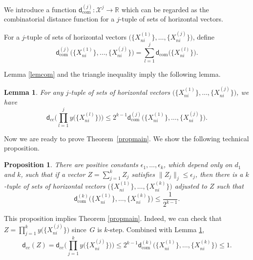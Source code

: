 \documentclass[10pt,a4paper]{amsart}
\numberwithin{equation}{section}
\newtheorem{Lemma}[Theorem]{Lemma}
\newtheorem{Proposition}[Theorem]{Proposition}
\newcommand{\R}{\mathbb{R}}
\begin{document}
We introduce a function $\mathsf{d}_{\mathrm{com}}^{(j)}\colon \mathcal{X}^j\to\R$ which can be regarded as the combinatorial distance function for a $j$-tuple of sets of horizontal vectors.

\begin{Definition}
 For a $j$-tuple of sets of horizontal vectors $\big(\bigl\{X_{ni}^{(1)}\bigr\},\dots,\bigl\{X_{ni}^{(j)}\bigr\}\big)$,
 define
 \[\mathsf{d}_{\mathrm{com}}^{(j)}\big(\bigl\{X_{ni}^{(1)}\bigr\},\dots,\bigl\{X_{ni}^{(j)}\bigr\}\big)= \sum_{l=1}^j\mathsf{d}_{\mathrm{com}}\big(\bigl\{X_{ni}^{(l)}\bigr\}\big).\]
\end{Definition}

Lemma \ref{lemcom} and the triangle inequality imply the following lemma.

\begin{Lemma}\label{lemcom2}
 For any $j$-tuple of sets of horizontal vectors $\big(\bigl\{X_{ni}^{(1)}\bigr\},\dots,\bigl\{X_{ni}^{(j)}\bigr\}\big)$,
 we have
 \[
 \mathsf{d}_{cc}\Bigg(\prod_{l=1}^jy\big(\bigl\{X_{ni}^{(l)}\bigr\}\big)\Bigg)\leq 2^{k-1}\mathsf{d}_{\mathrm{com}}^{(j)}\big(\bigl\{X_{ni}^{(1)}\bigr\}, \dots,\bigl\{X_{ni}^{(j)}\bigr\}\big).
 \]
\end{Lemma}

Now we are ready to prove Theorem~\ref{propmain}.
We show the following technical proposition.

\begin{Proposition}
 There are positive constants $\epsilon_1,\dots,\epsilon_k$,
 which depend only on $d_1$ and $k$,
 such that if a vector $Z=\sum_{j=1}^k Z_j$ satisfies $\|Z_j\|_j\leq \epsilon_j$,
 then there is a $k$-tuple of sets of horizontal vectors $\big(\bigl\{X_{ni}^{(1)}\bigr\},\dots,\bigl\{X_{ni}^{(k)}\bigr\}\big)$ adjusted to $Z$ such that
 \[
 \mathsf{d}_{\mathrm{com}}^{(k)}\big(\bigl\{X_{ni}^{(1)}\bigr\},\dots, \bigl\{X_{ni}^{(k)}\bigr\}\big)\leq \frac{1}{2^{k-1}}.
 \]
\end{Proposition}

This proposition implies Theorem \ref{propmain}.
Indeed,
we can check that $Z=\prod_{j=1}^ky\big(\bigl\{X_{ni}^{(j)}\bigr\}\big)$ since~$G$ is $k$-step.
Combined with Lemma \ref{lemcom2},
\[
\mathsf{d}_{cc}(Z)=\mathsf{d}_{cc}\Bigg(\prod_{j=1}^ky\big(\bigl\{X_{ni}^{(j)}\bigr\}\big)\Bigg)\leq 2^{k-1}\mathsf{d}_{\mathrm{com}}^{(k)}\big(\bigl\{X_{ni}^{(1)}\bigr\}, \dots,\bigl\{X_{ni}^{(k)}\bigr\}\big)\leq 1.
\]
\end{document}
